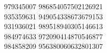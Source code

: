 979345007 986854057502126921\\
935359631 949054338673679153\\
931936021 989518940305146613\\
984974633 972090414870546877\\
984858209 956380060632801307\\
